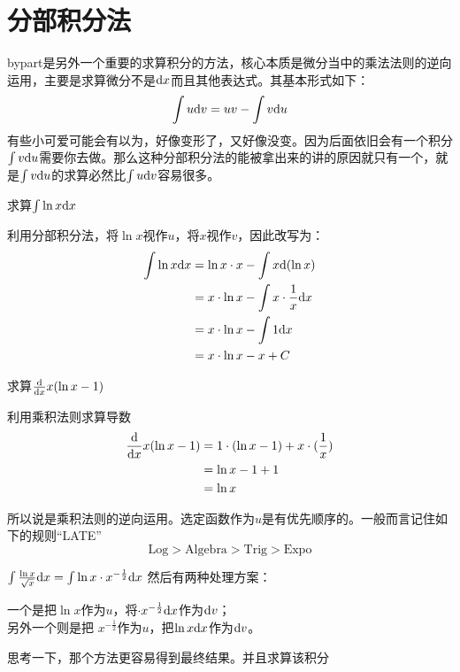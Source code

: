 \section{分部积分法}
\gls{bypart}是另外一个重要的求算积分的方法，核心本质是微分当中的乘法法则的逆向运用，主要是求算微分不是${\mathrm{d}} x$而且其他表达式。其基本形式如下：
\[
  \int u{\mathrm{d}} v= uv-\int v{\mathrm{d}} u
\]
有些小可爱可能会有以为，好像变形了，又好像没变。因为后面依旧会有一个积分$\int v{\mathrm{d}} u$需要你去做。那么这种分部积分法的能被拿出来的讲的原因就只有一个，就是$\int v{\mathrm{d}} u$的求算必然比$\int u{\mathrm{d}} v$容易很多。

\begin{ExampleBox}
\begin{multicols}{2}
求算$\int \ln x {\mathrm{d}} x$


利用分部积分法，将$\ln x$视作$u$，将$x$视作$v$，因此改写为：
\begin{align*}
\int \ln x {\mathrm{d}} x &= \ln x \cdot x -\int x {\mathrm{d}} (\ln x)\\
                &= x\cdot \ln x -\int x \cdot \frac{1}{x}{\mathrm{d}} x\\
                &=x\cdot \ln x-\int 1 {\mathrm{d}} x\\
                &=x\cdot \ln x -x +C\\
\end{align*}

\vfill\null
\columnbreak
求算$\frac{{\mathrm{d}}}{{\mathrm{d}} x} x(\ln x - 1)$


利用乘积法则求算导数
\begin{align*}
\frac{{\mathrm{d}}}{{\mathrm{d}} x} x(\ln x - 1) &= 1\cdot (\ln x-1)+x\cdot (\frac{1}{x})\\
&=\ln x -1 +1\\
&=\ln x
\end{align*}
\end{multicols}
\end{ExampleBox}
所以说是乘积法则的逆向运用。选定函数作为$u$是有优先顺序的。一般而言记住如下的规则``LATE''
\[
  \text{Log}>\text{Algebra}>\text{Trig}>\text{Expo}
\]

\begin{TaskBox}
$\int \frac{\ln x}{\sqrt x}{\mathrm{d}} x = \int \ln x \cdot x^{-\frac{1}{2}} {\mathrm{d}} x$ 然后有两种处理方案：

一个是把$\ln x$作为$u$，将$\cdot x^{-\frac{1}{2}} {\mathrm{d}} x$作为${\mathrm{d}} v$；\\
另外一个则是把 $x^{-\frac{1}{2}}$作为$u$，把$\ln x {\mathrm{d}} x$作为${\mathrm{d}} v$。

思考一下，那个方法更容易得到最终结果。并且求算该积分
\end{TaskBox}




